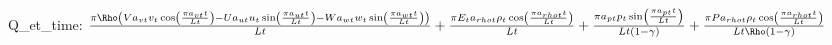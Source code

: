  Q_et_time: 
$\frac{\pi \Rho \left(V a_{vt} v_{t} \operatorname{cos}\left(\frac{\pi a_{vt} t}{Lt}\right) - U a_{ut} u_{t} \operatorname{sin}\left(\frac{\pi a_{ut} t}{Lt}\right) - W a_{wt} w_{t} \operatorname{sin}\left(\frac{\pi a_{wt} t}{Lt}\right)\right)}{Lt} + \frac{\pi E_{t} a_{rhot} \rho_{t} \operatorname{cos}\left(\frac{\pi a_{rhot} t}{Lt}\right)}{Lt} + \frac{\pi a_{pt} p_{t} \operatorname{sin}\left(\frac{\pi a_{pt} t}{Lt}\right)}{Lt \left(1 - \gamma\right)} + \frac{\pi P a_{rhot} \rho_{t} \operatorname{cos}\left(\frac{\pi a_{rhot} t}{Lt}\right)}{Lt \Rho \left(1 - \gamma\right)}$